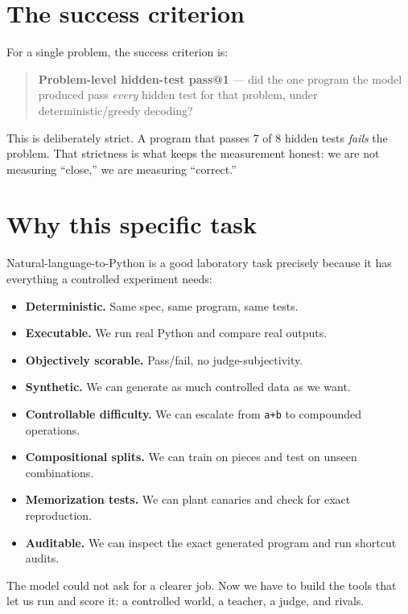 \section{The success criterion}\label{the-success-criterion}

For a single problem, the success criterion is:

\begin{quote}
\textbf{Problem-level hidden-test pass@1} --- did the one program the
model produced pass \emph{every} hidden test for that problem, under
deterministic/greedy decoding?
\end{quote}

This is deliberately strict. A program that passes 7 of 8 hidden tests
\emph{fails} the problem. That strictness is what keeps the measurement
honest: we are not measuring ``close,'' we are measuring ``correct.''

\section{Why this specific task}\label{why-this-specific-task}

Natural-language-to-Python is a good laboratory task precisely because
it has everything a controlled experiment needs:

\begin{itemize}
\tightlist
\item
  \textbf{Deterministic.} Same spec, same program, same tests.
\item
  \textbf{Executable.} We run real Python and compare real outputs.
\item
  \textbf{Objectively scorable.} Pass/fail, no judge-subjectivity.
\item
  \textbf{Synthetic.} We can generate as much controlled data as we
  want.
\item
  \textbf{Controllable difficulty.} We can escalate from \texttt{a+b} to
  compounded operations.
\item
  \textbf{Compositional splits.} We can train on pieces and test on
  unseen combinations.
\item
  \textbf{Memorization tests.} We can plant canaries and check for exact
  reproduction.
\item
  \textbf{Auditable.} We can inspect the exact generated program and run
  shortcut audits.
\end{itemize}

The model could not ask for a clearer job. Now we have to build the
tools that let us run and score it: a controlled world, a teacher, a
judge, and rivals.
